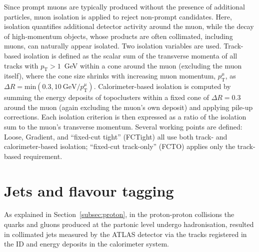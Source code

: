 Since prompt muons are typically produced without the presence of additional particles, muon isolation is applied to reject non-prompt candidates. Here, isolation quantifies additional detector activity around the muon, while the decay of high-momentum objects, whose products are often collimated, including muons, can naturally appear isolated.
Two isolation variables are used. Track-based isolation is defined as the scalar sum of the transverse momenta of all tracks with $p_{\text{T}}>1$~GeV within a cone around the muon (excluding the muon itself), where the cone size shrinks with increasing muon momentum, $p^{\mu}_{\text{T}}$, as $\Delta R = \text{min}(0.3, 10~\text{GeV}/p^{\mu}_{\text{T}})$.
Calorimeter-based isolation is computed by summing the energy deposits of topoclusters within a fixed cone of $\Delta R=0.3$ around the muon (again excluding the muon’s own deposit) and applying pile-up corrections. Each isolation criterion is then expressed as a ratio of the isolation sum to the muon’s transverse momentum.
Several working points are defined: Loose, Gradient, and ``fixed-cut tight'' (FCTight) all use both track- and calorimeter-based isolation; ``fixed-cut track-only'' (FCTO) applies only the track-based requirement.

\section{Jets and flavour tagging}
\label{sec:jets}
As explained in Section~\ref{subsec:proton}, in the proton-proton collisions the quarks and gluons produced at the partonic level undergo hadronisation, resulted in collimated jets measured by the ATLAS detector via the tracks registered in the ID and energy deposits in the calorimeter system. 

